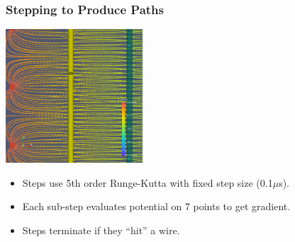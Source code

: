\documentclass[xcolor=dvipsnames]{beamer}
\begin{document}
\begin{frame}
  \frametitle{Stepping to Produce Paths}
  \begin{center}
    \includegraphics[height=5cm,clip,trim=0cm 0cm 0cm 17cm]{steps/upaths3.png}
  \end{center}
  \begin{itemize}\footnotesize
  \item Steps use 5th order Runge-Kutta with fixed step size (0.1$\mu$s).
  \item Each sub-step evaluates potential on 7 points to get gradient.
  \item Steps terminate if they ``hit'' a wire.
  \end{itemize}

\end{frame}
\end{document}
